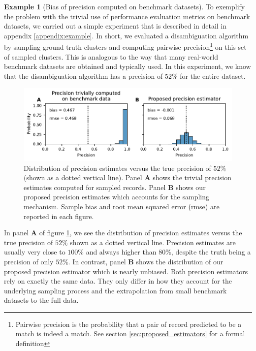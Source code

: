 \documentclass[fontsize=11pt]{article}
\theoremstyle{definition}
\newtheorem{example}{Example}
\begin{document}
\begin{example}[Bias of precision computed on benchmark datasets]\label{first_example}
    To exemplify the problem with the trivial use of performance evaluation metrics on benchmark datasets, we carried out a simple experiment that is described in detail in appendix \ref{appendix:example}. In short, we evaluated a disambiguation algorithm by sampling ground truth clusters and computing pairwise precision\footnote{Pairwise precision is the probability that a pair of record predicted to be a match is indeed a match. See section \ref{sec:proposed_estimators} for a formal definition} on this set of sampled clusters. This is analogous to the way that many real-world benchmark datasets are obtained and typically used. In this experiment, we know that the disambiguation algorithm has a precision of $52\%$ for the entire dataset.
    
    \begin{figure}[h]
        \centering
        \includegraphics[width=5.5in]{first-example}
        \caption{Distribution of precision estimates versus the true precision of $52\%$ (shown as a dotted vertical line). Panel \textbf{A} shows the trivial precision estimates computed for sampled records. Panel \textbf{B} shows our proposed precision estimates which accounts for the sampling mechanism. Sample bias and root mean squared error (rmse) are reported in each figure.}
        \label{fig:precision_problem}
    \end{figure}
    
    In panel \textbf{A} of figure \ref{fig:precision_problem}, we see the distribution of precision estimates versus the true precision of $52\%$ shown as a dotted vertical line. Precision estimates are usually very close to $100\%$ and always higher than $80\%$, despite the truth being a precision of only $52\%$. In contrast, panel \textbf{B} shows the distribution of our proposed precision estimator which is nearly unbiased. Both precision estimators rely on exactly the same data. They only differ in how they account for the underlying sampling process and the extrapolation from small benchmark datasets to the full data.
    
\end{example}
\end{document}
